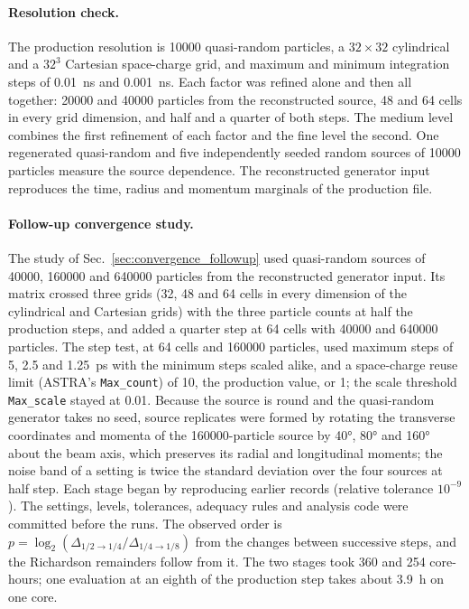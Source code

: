 \documentclass[aps,prab,reprint,superscriptaddress,amsmath,amssymb,floatfix]{revtex4-2}
\begin{document}
\paragraph{Resolution check.} The production resolution is \num{10000} quasi-random
particles, a $32\times32$ cylindrical and a $32^3$ Cartesian space-charge grid, and maximum
and minimum integration steps of \SI{0.01}{\nano\second} and \SI{0.001}{\nano\second}. Each
factor was refined alone and then all together: \num{20000} and \num{40000} particles from
the reconstructed source, 48 and 64 cells in every grid dimension, and half and a quarter of
both steps. The medium level combines the first refinement of each factor and the fine level
the second. One regenerated quasi-random and five independently seeded random sources of
\num{10000} particles measure the source dependence. The reconstructed generator input
reproduces the time, radius and momentum marginals of the production file.

\paragraph{Follow-up convergence study.} The study of Sec.~\ref{sec:convergence_followup} used
quasi-random sources of \num{40000}, \num{160000} and \num{640000} particles from the
reconstructed generator input. Its matrix crossed three grids (32, 48 and 64 cells in every
dimension of the cylindrical and Cartesian grids) with the three particle counts at half the
production steps, and added a quarter step at 64 cells with \num{40000} and \num{640000}
particles. The step test, at 64 cells and \num{160000} particles, used maximum steps of
5, 2.5 and \SI{1.25}{\pico\second} with the minimum steps scaled alike, and a space-charge
reuse limit (ASTRA's \texttt{Max\_count}) of 10, the production value, or 1; the scale
threshold \texttt{Max\_scale} stayed at 0.01. Because the source is round and the quasi-random
generator takes no seed, source replicates were formed by rotating the transverse coordinates
and momenta of the \num{160000}-particle source by \ang{40}, \ang{80} and \ang{160} about the
beam axis, which preserves its radial and longitudinal moments; the noise band of a setting is
twice the standard deviation over the four sources at half step. Each stage began by
reproducing earlier records (relative tolerance $10^{-9}$). The settings, levels, tolerances,
adequacy rules and analysis code were committed before the runs. The observed order is
$p=\log_2(\Delta_{1/2\to1/4}/\Delta_{1/4\to1/8})$ from the changes between successive steps,
and the Richardson remainders follow from it. The two stages took 360 and 254 core-hours; one
evaluation at an eighth of the production step takes about \SI{3.9}{\hour} on one core.
\end{document}
